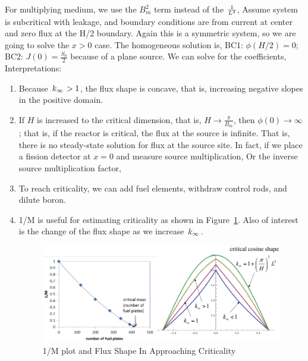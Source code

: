\documentclass{school-22.211-notes}
\begin{document}
\clearpage
{}
For multiplying medium, we use the $B_m^2$ term instead of the $\frac{1}{L^2}$,
Assume system is subcritical with leakage, and boundary conditions are from current at center and zero flux at the H/2 boundary. Again this is a symmetric system, so we are going to solve the $x>0$ case. The homogeneous solution is,
BC1: $\phi(H/2) = 0$; BC2: $J(0) = \frac{S_0}{2}$ because of a plane source. We can solve for the coefficients,
Interpretations:
\begin{enumerate}
\item Because $\left. k_{\infty} \right. > 1$, the flux shape is concave, that is, increasing negative slopes in the positive domain.  
\item If $H$ is increased to the critical dimension, that is, $H \to \frac{\pi}{B_m}$, then $\phi(0) \to \infty$; that is, if the reactor is critical, the flux at the source is infinite. That is, there is no steady-state solution for flux at the source site. In fact, if we place a fission detector at $x=0$ and measure source multiplication, 
  Or the inverse source multiplication factor, 
\item To reach criticality, we can add fuel elements, withdraw control rods, and dilute boron. 
\item 1/M is useful for estimating criticality as shown in Figure~\ref{approach-critical}. Also of interest is the change of the flux shape as we increase $\left. k_{\infty} \right.$. 
  \begin{figure}
    \centering
    \includegraphics[width=5in]{images/dfs/approach-critical.png}
    \caption{1/M plot and Flux Shape In Approaching Criticality}\label{approach-critical}
  \end{figure}
\end{enumerate}
\end{document}
